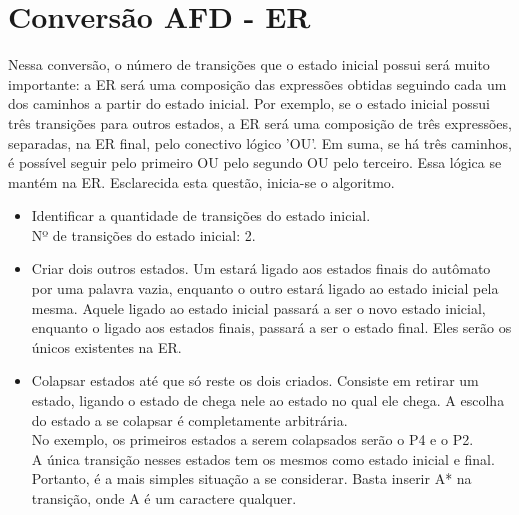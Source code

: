\documentclass[a4paper,10pt]{article} %
\begin{document}
\section{Conversão AFD - ER}
    Nessa conversão, o número de transições que o estado inicial possui será muito importante: a ER será uma composição das expressões obtidas seguindo cada um dos caminhos a partir do estado inicial. Por exemplo, se o estado inicial possui três transições para outros estados, a ER será uma composição de três expressões, separadas, na ER final, pelo conectivo lógico 'OU'. Em suma, se há três caminhos, é possível seguir pelo primeiro OU pelo segundo OU pelo terceiro. Essa lógica se mantém na ER. Esclarecida esta questão, inicia-se o algoritmo.
    \begin{itemize}
        \item Identificar a quantidade de transições do estado inicial.\\Nº de transições do estado inicial: 2.
        \item Criar dois outros estados. Um estará ligado aos estados finais do autômato por uma palavra vazia, enquanto o outro estará ligado ao estado inicial pela mesma. Aquele ligado ao estado inicial passará a ser o novo estado inicial, enquanto o ligado aos estados finais, passará a ser o estado final. Eles serão os únicos existentes na ER.
            \begin{center}
            \end{center}
        \item Colapsar estados até que só reste os dois criados. Consiste em retirar um estado, ligando o estado de chega nele ao estado no qual ele chega. A escolha do estado a se colapsar é completamente arbitrária.\\No exemplo, os primeiros estados a serem colapsados serão o P4 e o P2.\\A única transição nesses estados tem os mesmos como estado inicial e final. Portanto, é a mais simples situação a se considerar. Basta inserir A* na transição, onde A é um caractere qualquer.

\end{itemize}
\end{document}
